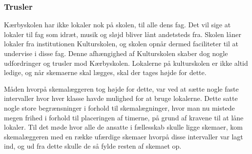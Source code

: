\subsubsection*{Trusler}
Kærbyskolen har ikke lokaler nok på skolen, til alle dens fag. Det vil sige at lokaler til fag som idræt, musik og sløjd bliver lånt andetsteds fra. Skolen låner lokaler fra institutionen Kulturskolen, og skolen opnår dermed faciliteter til at undervise i disse fag. Denne afhængighed af Kulturskolen skaber dog nogle udfordringer og trusler mod Kærbyskolen. Lokalerne på kulturskolen er ikke altid ledige, og når skemaerne skal lægges, skal der tages højde for dette. 

Måden hvorpå skemalæggeren tog højde for dette, var ved at sætte nogle faste intervaller hvor hver klasse havde mulighed for at bruge lokalerne. Dette satte nogle store begrænsninger i forhold til skemalægninger, hvor man nu mistede megen frihed i forhold til placeringen af timerne, på grund af kravene til at låne lokaler. Til det møde hvor alle de ansatte i fællesskab skulle ligge skemaer, kom skemalæggeren med en række ufærdige skemaer hvorpå disse intervaller var lagt ind, og ud fra dette skulle de så fylde resten af skemaet op. 